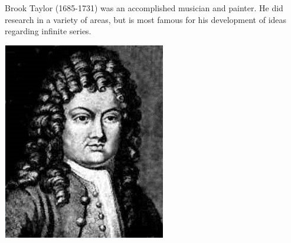 \begin{frame}
Brook Taylor (1685-1731) was an accomplished musician and painter.  He did research in a variety of areas, but is most famous for his development of ideas regarding infinite series.

\begin{center}
\includegraphics[width=0.4\linewidth]{Taylor-Polynomials/pictures/Taylor.PNG}
\end{center}


\end{frame}
